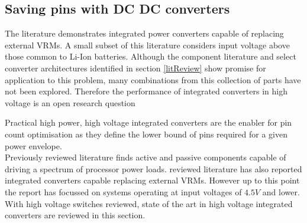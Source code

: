 \documentclass[letterpaper,twocolumn,10pt]{article}
\begin{document}
\subsection{Saving pins with DC DC converters}

The literature demonstrates integrated power converters capable of replacing external VRMs. A small subset of this literature considers input voltage above those common to Li-Ion batteries. 
\indent Although the component literature and select converter architectures identified in section \ref{litReview} show promise for application to this problem, many combinations from this collection of parts have not been explored. Therefore the performance of integrated converters in high voltage is an open research question

Practical high power, high voltage integrated converters are the enabler for pin count optimisation as they define the lower bound of pins required for a given power envelope.\\
Previously reviewed literature finds active and passive components capable of driving a spectrum of processor power loads. reviewed literature has also reported integrated converters capable replacing external VRMs. However up to this point the report has focussed on systems operating at input voltages of $4.5V$ and lower. With high voltage switches reviewed, state of the art in high voltage integrated converters are reviewed in this section.\\
\end{document}
